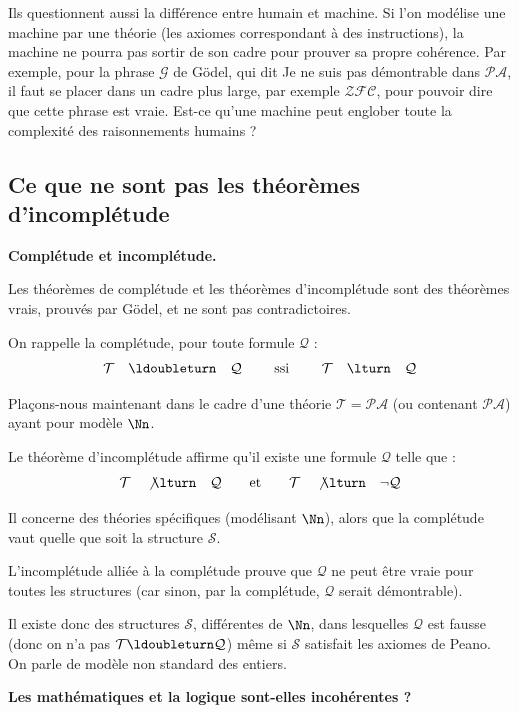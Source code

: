 \documentclass[11pt,class=report,crop=false]{standalone}
\begin{document}
Ils questionnent aussi la différence entre humain et machine. 
Si l'on modélise une machine par une théorie (les axiomes correspondant à des instructions), la machine ne pourra pas sortir de son cadre pour prouver sa propre cohérence. Par exemple, pour la phrase $\mathcal{G}$ de Gödel, qui dit \og{}Je ne suis pas démontrable dans $\mathcal{PA}$\fg{}, il faut se placer dans un cadre plus large, par exemple $\mathcal{ZFC}$, pour pouvoir dire que cette phrase est vraie. Est-ce qu'une machine peut englober toute la complexité des raisonnements humains ?


\subsection{Ce que ne sont pas les théorèmes d'incomplétude}

\textbf{Complétude et incomplétude.}

Les théorèmes de complétude et les théorèmes d'incomplétude sont des théorèmes vrais, prouvés par Gödel, et ne sont pas contradictoires.

On rappelle la complétude, pour toute formule $\mathcal{Q}$ :
$$\mathcal{T} \quad \ldoubleturn \quad  \mathcal{Q} \qquad \text{ ssi } \qquad \mathcal{T} \quad \lturn \quad \mathcal{Q}$$

Plaçons-nous maintenant dans le cadre d'une théorie $\mathcal{T}=\mathcal{PA}$ (ou contenant $\mathcal{PA}$) ayant pour modèle $\Nn$.

Le théorème d'incomplétude affirme qu'il existe une formule $\mathcal{Q}$ telle que :
$$\mathcal{T} \quad \not\lturn \quad \mathcal{Q} \qquad \text{et} \qquad \mathcal{T} \quad \not\lturn \quad \lnot\mathcal{Q}$$

Il concerne des théories spécifiques (modélisant $\Nn$), alors que la complétude vaut quelle que soit la structure $\mathcal{S}$.

L'incomplétude alliée à la complétude prouve que $\mathcal{Q}$ ne peut être vraie pour toutes les structures (car sinon, par la complétude, $\mathcal{Q}$ serait démontrable).

Il existe donc des structures $\mathcal{S}$, différentes de $\Nn$, dans lesquelles $\mathcal{Q}$ est fausse (donc on n'a pas $\mathcal{T} \ldoubleturn \mathcal{Q}$) même si $\mathcal{S}$ satisfait les axiomes de Peano. On parle de modèle non standard des entiers.

\bigskip

\textbf{Les mathématiques et la logique sont-elles incohérentes ?}
\end{document}
